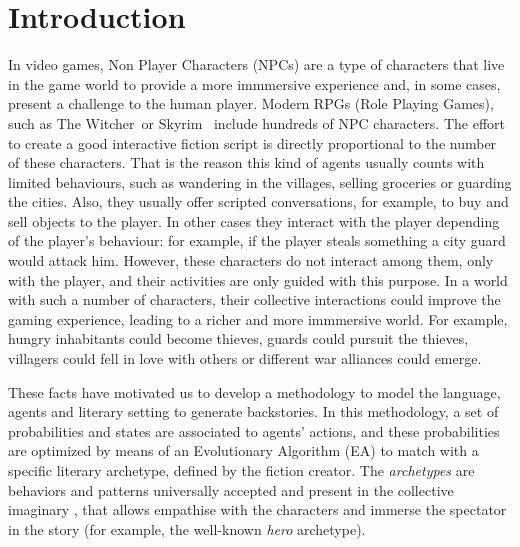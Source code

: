 \documentclass{sig-alternate}
\begin{document}






%
%
\section{Introduction}
\label{sec:intro}

In video games, Non Player Characters (NPCs)  are a type of characters
that live in the game world to provide a more immmersive
experience and, in some cases, present a challenge to the human player. Modern RPGs (Role Playing Games), such as The
Witcher\texttrademark~or Skyrim\texttrademark~ include hundreds of NPC characters. The effort to create a good interactive fiction script is directly proportional to the number of these characters. That is the reason this kind of agents usually counts with limited behaviours, such as wandering in the villages, selling groceries or guarding the cities. Also, they usually offer scripted conversations, for example, to buy and sell objects to the player. In other cases they interact with the player depending of the player's behaviour: for example, if the player steals something a city guard would attack him.  However, these characters do not interact among them, only with the player, and their activities are only guided with this purpose. In a world with such a number of characters, their collective interactions could improve the gaming experience, leading to a richer and more immmersive world. For example, hungry inhabitants could become thieves, guards could pursuit the thieves, villagers could fell in love with others or different war alliances could emerge.


These facts have motivated us to develop a methodology to model the language, agents and literary setting to generate backstories. In this methodology, a set of probabilities and
states are associated to agents' actions, and these probabilities are
optimized by means of an Evolutionary Algorithm (EA) to match with a
specific literary archetype, defined by the fiction creator. The {\em
archetypes} are behaviors and patterns universally accepted and
present in the collective imaginary
 \cite{ArchetypesGarry05}, that
allows empathise  %
with the characters and immerse the spectator in the story
(for example, the well-known {\em hero} archetype).
\end{document}
